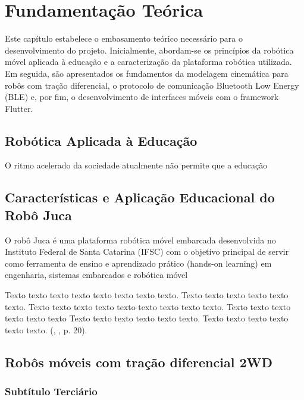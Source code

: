 \chapter{Fundamentação Teórica}

Este capítulo estabelece o embasamento teórico necessário para o desenvolvimento do projeto. Inicialmente, abordam-se os princípios da robótica móvel aplicada à educação e a caracterização da plataforma robótica utilizada. Em seguida, são apresentados os fundamentos da modelagem cinemática para robôs com tração diferencial, o protocolo de comunicação Bluetooth Low Energy (BLE) e, por fim, o desenvolvimento de interfaces móveis com o framework Flutter.

\section{Robótica Aplicada à Educação}

O ritmo acelerado da sociedade atualmente não permite que a educação


\section{Características e Aplicação Educacional do Robô Juca}

O robô Juca é uma plataforma robótica móvel embarcada desenvolvida no Instituto Federal de Santa Catarina (IFSC) com o objetivo principal de servir como ferramenta de ensino e aprendizado prático (hands-on learning) em engenharia, sistemas embarcados e robótica móvel


 \begin{citacao}
            \begin{alineas}[leftmargin=\leftskip+\labelwidth-\labelsep]
                Texto texto texto texto texto texto texto texto. Texto texto texto texto texto texto. Texto texto texto texto texto texto texto texto texto. Texto texto texto texto texto texto Texto texto texto texto texto texto. Texto texto texto texto texto texto. (\citeauthor{ref:ibmm}, \citeyear{ref:ibmm}, p. 20).
            \end{alineas}
\end{citacao}

\section{Robôs móveis com tração diferencial 2WD}

\subsection{Subtítulo Terciário}

